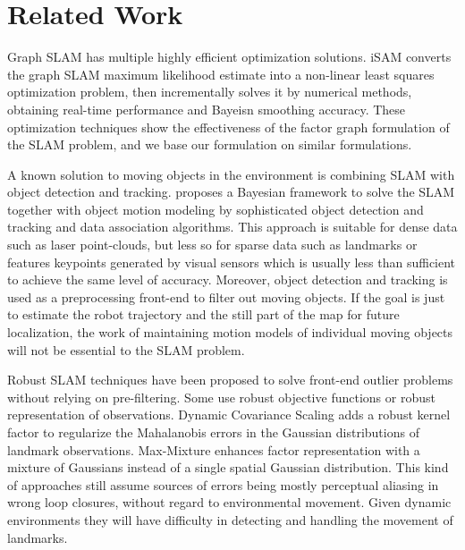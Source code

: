 \section{Related Work}

Graph SLAM has multiple highly efficient optimization solutions.
iSAM\cite{isam} converts the graph SLAM maximum likelihood estimate into a
non-linear least squares optimization problem, then incrementally solves it by
numerical methods, obtaining real-time performance and Bayeisn smoothing
accuracy. These optimization techniques show the effectiveness of the factor
graph formulation of the SLAM problem, and we base our formulation on similar
formulations.

A known solution to moving objects in the environment is combining SLAM with
object detection and tracking. \cite{wang2003online} proposes a Bayesian
framework to solve the SLAM together with object motion modeling by
sophisticated object detection and tracking and data association algorithms.
This approach is suitable for dense data such as laser point-clouds, but less
so for sparse data such as landmarks or features keypoints generated by visual
sensors which is usually less than sufficient to achieve the same level of
accuracy.  Moreover, object detection and tracking is used as a preprocessing
front-end to filter out moving objects. If the goal is just to estimate the
robot trajectory and the still part of the map for future localization, the
work of maintaining motion models of individual moving objects will not be
essential to the SLAM problem. 

Robust SLAM techniques have been proposed to solve front-end outlier problems
without relying on pre-filtering. Some use robust objective functions or robust
representation of observations. Dynamic Covariance Scaling\cite{DCS} adds a
robust kernel factor to regularize the Mahalanobis errors in the Gaussian
distributions of landmark observations.  Max-Mixture\cite{mm} enhances factor
representation with a mixture of Gaussians instead of a single spatial Gaussian
distribution. This kind of approaches still assume sources of errors being
mostly perceptual aliasing in wrong loop closures, without regard to
environmental movement.  Given dynamic environments they will have difficulty
in detecting and handling the movement of landmarks.

